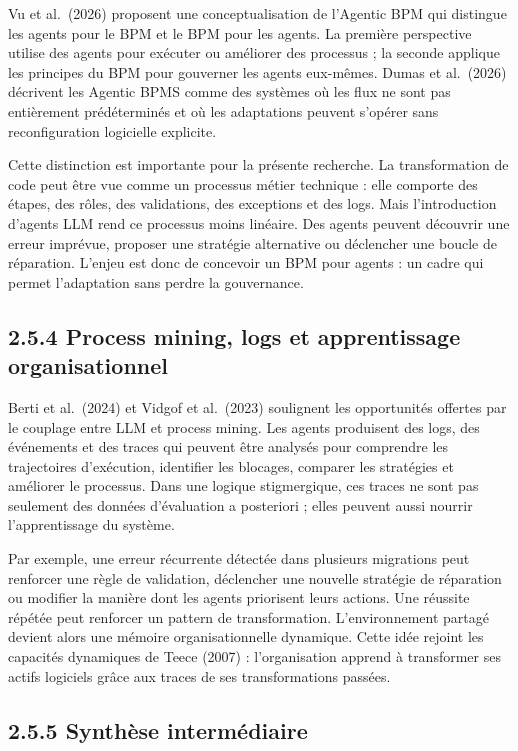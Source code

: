 Vu et al.~(2026) proposent une conceptualisation de l'Agentic BPM qui distingue les agents pour le BPM et le BPM pour les agents. La première perspective utilise des agents pour exécuter ou améliorer des processus ; la seconde applique les principes du BPM pour gouverner les agents eux-mêmes. Dumas et al.~(2026) décrivent les Agentic BPMS comme des systèmes où les flux ne sont pas entièrement prédéterminés et où les adaptations peuvent s'opérer sans reconfiguration logicielle explicite.

Cette distinction est importante pour la présente recherche. La transformation de code peut être vue comme un processus métier technique : elle comporte des étapes, des rôles, des validations, des exceptions et des logs. Mais l'introduction d'agents LLM rend ce processus moins linéaire. Des agents peuvent découvrir une erreur imprévue, proposer une stratégie alternative ou déclencher une boucle de réparation. L'enjeu est donc de concevoir un BPM pour agents : un cadre qui permet l'adaptation sans perdre la gouvernance.

\subsection{2.5.4 Process mining, logs et apprentissage organisationnel}\label{process-mining-logs-et-apprentissage-organisationnel}

Berti et al.~(2024) et Vidgof et al.~(2023) soulignent les opportunités offertes par le couplage entre LLM et process mining. Les agents produisent des logs, des événements et des traces qui peuvent être analysés pour comprendre les trajectoires d'exécution, identifier les blocages, comparer les stratégies et améliorer le processus. Dans une logique stigmergique, ces traces ne sont pas seulement des données d'évaluation a posteriori ; elles peuvent aussi nourrir l'apprentissage du système.

Par exemple, une erreur récurrente détectée dans plusieurs migrations peut renforcer une règle de validation, déclencher une nouvelle stratégie de réparation ou modifier la manière dont les agents priorisent leurs actions. Une réussite répétée peut renforcer un pattern de transformation. L'environnement partagé devient alors une mémoire organisationnelle dynamique. Cette idée rejoint les capacités dynamiques de Teece (2007) : l'organisation apprend à transformer ses actifs logiciels grâce aux traces de ses transformations passées.

\subsection{2.5.5 Synthèse intermédiaire}\label{synthuxe8se-intermuxe9diaire-3}

